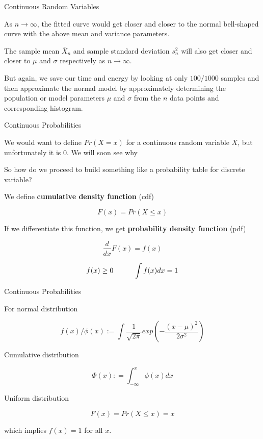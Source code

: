 \documentclass{beamer}\usepackage[]{graphicx}\usepackage[]{color}
\begin{document}
\begin{frame}{Continuous Random Variables}

As $n \rightarrow \infty$, the fitted curve would get closer and closer to the normal bell-shaped curve with the above mean and variance parameters. \pause \newline

The sample mean $\bar{X}_{n}$ and sample standard deviation $s^2_{n}$ will also get closer and closer to $\mu$ and $\sigma$ respectively as $n \rightarrow \infty$. \pause \newline

But again, we save our time and energy by looking at only $100/1000$ samples and then approximate the normal model by approximately determining the population or model parameters $\mu$ and $\sigma$ from the $n$ data points and corresponding histogram.

\end{frame}

\begin{frame}{Continuous Probabilities}

We would want to define $Pr(X=x)$ for a continuous random variable $X$, but unfortunately it is $0$. We will soon see why \pause \newline

So how do we proceed to build something like a probability table for discrete variable?

We define \textbf{cumulative density function} (cdf)

$$ F(x) = Pr (X \leq x) $$

If we differentiate this function, we get \textbf{probability density function} (pdf)

$$ \frac{d}{dx} F(x) = f(x) $$

$$ f(x) \geq 0 \hspace {1 cm} \int f(x) dx = 1 $$

\end{frame}

\begin{frame}{Continuous Probabilities}

For normal distribution

$$ f(x)/ \phi(x) := \int \frac{1}{\sqrt{2 \pi}} exp \left (-\frac{(x-\mu)^2}{2 \sigma^2} \right ) $$

Cumulative distribution

$$ \Phi(x) : = \int_{-\infty}^{x} \phi(x) dx $$

Uniform distribution

$$ F(x) = Pr(X \leq x) = x $$

which implies $ f(x)=1$ for all $x$.

\end{frame}
\end{document}
